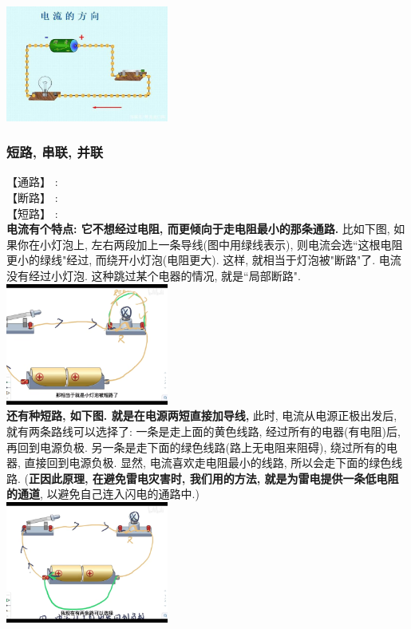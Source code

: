 \documentclass[UTF8]{ctexart}
\begin{document}
	\includegraphics[width=0.4\textwidth]{img/0052.png} \\
	
	
	
	\vspace{1em} 
	
	\subsubsection{短路, 串联, 并联}
	
	【通路】 : \\
	【断路】 : \\	
	
	【短路】 : \\
		\textbf{电流有个特点: 它不想经过电阻, 而更倾向于走电阻最小的那条通路.} 比如下图, 如果你在小灯泡上, 左右两段加上一条导线(图中用绿线表示), 则电流会选``这根电阻更小的绿线"经过, 而绕开小灯泡(电阻更大). 这样, 就相当于灯泡被"断路"了. 电流没有经过小灯泡. 这种跳过某个电器的情况, 就是``局部断路". \\
		
	\includegraphics[width=0.4\textwidth]{img/0074.png} \\
	
	\textbf{还有种短路, 如下图. 就是在电源两短直接加导线,} 此时, 电流从电源正极出发后, 就有两条路线可以选择了: 一条是走上面的黄色线路, 经过所有的电器(有电阻)后, 再回到电源负极. 另一条是走下面的绿色线路(路上无电阻来阻碍), 绕过所有的电器, 直接回到电源负极. 显然, 电流喜欢走电阻最小的线路, 所以会走下面的绿色线路. (\textbf{正因此原理, 在避免雷电灾害时, 我们用的方法, 就是为雷电提供一条低电阻的通道}, 以避免自己连入闪电的通路中.) \\
	
		\includegraphics[width=0.4\textwidth]{img/0075.png} \\
	
\end{document}
